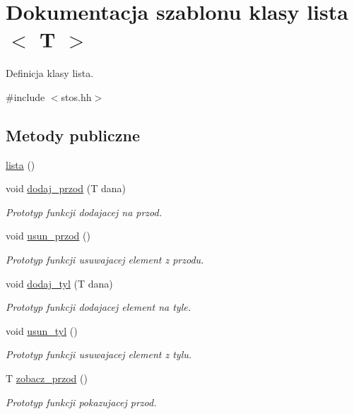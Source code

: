 \hypertarget{classlista}{\section{\-Dokumentacja szablonu klasy lista$<$ \-T $>$}
\label{classlista}
}


\-Definicja klasy lista.  




{\ttfamily \#include $<$stos.\-hh$>$}

\subsection*{\-Metody publiczne}
\begin{DoxyCompactItemize}
\item 
\hyperlink{classlista_adfa22c0202d7ac7abfe006dbd3b5a12a}{lista} ()
\item 
void \hyperlink{classlista_abfffecd8200714da1c80bb11b9aade5e}{dodaj\-\_\-przod} (\-T dana)
\begin{DoxyCompactList}\small\item\em \-Prototyp funkcji dodajacej na przod. \end{DoxyCompactList}\item 
void \hyperlink{classlista_a6998ee006deb26a2e66d6b3df832a469}{usun\-\_\-przod} ()
\begin{DoxyCompactList}\small\item\em \-Prototyp funkcji usuwajacej element z przodu. \end{DoxyCompactList}\item 
void \hyperlink{classlista_ad35c120f3285b0a8a5069b540bc178ae}{dodaj\-\_\-tyl} (\-T dana)
\begin{DoxyCompactList}\small\item\em \-Prototyp funkcji dodajacej element na tyle. \end{DoxyCompactList}\item 
void \hyperlink{classlista_aa60cc53e042281898cead5bc99fd8fc8}{usun\-\_\-tyl} ()
\begin{DoxyCompactList}\small\item\em \-Prototyp funkcji usuwajacej element z tylu. \end{DoxyCompactList}\item 
\-T \hyperlink{classlista_aae75ab30e8130ff72c409ac74588e778}{zobacz\-\_\-przod} ()
\begin{DoxyCompactList}\small\item\em \-Prototyp funkcji pokazujacej przod. \end{DoxyCompactList}\item 

\end{DoxyCompactItemize}
